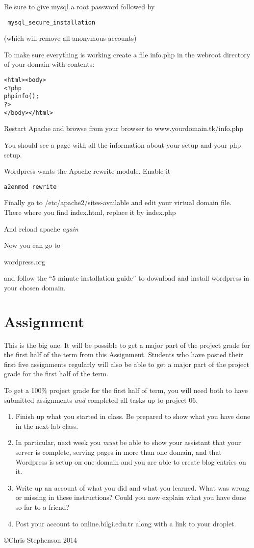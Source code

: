 \documentclass[12pt, a4paper]{article}
\begin{document}
Be sure to give mysql a root password
followed by

\begin{verbatim}
 mysql_secure_installation
\end{verbatim}

(which will remove all anonymous accounts)

To make sure everything is working create a file info.php in the webroot directory of your domain with contents:

\begin{verbatim}
<html><body>
<?php
phpinfo();
?>
</body></html>
\end{verbatim}

Restart Apache and browse from your browser to www.yourdomain.tk/info.php

You should see a page with all the information about your setup and your php setup.

Wordpress wants the Apache rewrite module. Enable it

\begin{verbatim}
a2enmod rewrite
\end{verbatim}


Finally go to /etc/apache2/sites-available and edit your virtual domain file. There where you find index.html, replace it by index.php

And reload apache \emph{again}

Now you can go to

wordpress.org

and follow the ``5 minute installation guide'' to download and install wordpress in your chosen domain.


\section*{Assignment}
This is the big one. It will be possible to get a major part of the project grade for the first half of the term from this Assignment. Students who have posted their first five assignments regularly will also be able to get a major part of the project grade for the first half of the term.

To get a 100\% project grade for the first half of term, you will need both to have submitted assignments \emph{and} completed all tasks up to project 06. 

\begin{enumerate}
\item Finish up what you started in class. Be prepared to show what you have done in the next lab class. 
\item In particular, next week you \emph{must} be able to show your assistant that your server is complete, serving pages in more than one domain, and that Wordpress is setup on one domain and you are able to create blog entries on it. 
\item Write up an account of what you did and what you learned. What was wrong or missing in these instructions? Could you now explain what you have done so far to a friend?
\item Post your account to online.bilgi.edu.tr along with a link to your droplet.

\end{enumerate}

\copyright Chris Stephenson 2014
\end{document}
